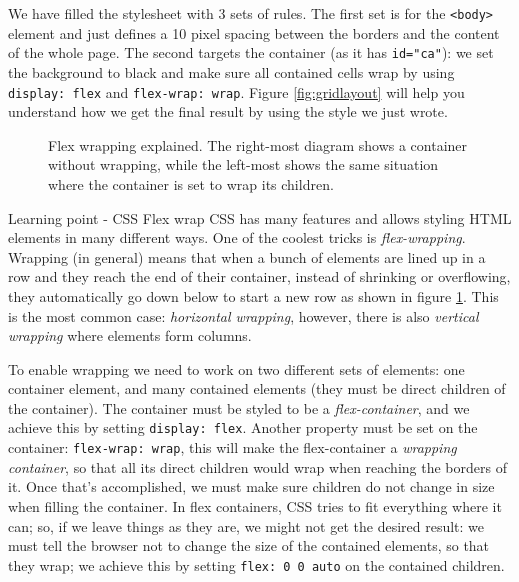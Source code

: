 We have filled the stylesheet with 3 sets of rules. The first set is for the \texttt{<body>} element
and just defines a 10 pixel spacing between the borders and the content of the whole page.
The second targets
the container (as it has \texttt{id="ca"}): we set the background to black and
make sure all contained cells wrap by using \texttt{display: flex} and \texttt{flex-wrap: wrap}.
Figure \ref{fig:gridlayout} will help you understand how we get the final result by using the
style we just wrote.

%
\begin{figure}[b]
\sidecaption

%
%
\caption{Flex wrapping explained. The right-most diagram shows a container without wrapping,
while the left-most shows the same situation where the container is set to wrap its children.}
\label{fig:flexwrap}
\end{figure}
%

\begin{tips}{Learning point - CSS Flex wrap}
CSS has many features and allows styling HTML elements in many different ways. One of the coolest tricks
is \textit{flex-wrapping}. Wrapping (in general) means that
when a bunch of elements are lined up in a row and they reach the
end of their container, instead of shrinking or overflowing, they automatically go down below to start a
new row as shown in figure \ref{fig:flexwrap}. This is the most common case: \textit{horizontal wrapping},
however, there is also \textit{vertical wrapping} where elements form columns.

To enable wrapping we need to work on two different sets of elements: one container element, and many
contained elements (they must be direct children of the container). The container must be styled to
be a \textit{flex-container}, and we achieve this by setting \texttt{display: flex}. Another property
must be set on the container: \texttt{flex-wrap: wrap}, this will make the flex-container a
\textit{wrapping container}, so that all its direct children would wrap when reaching the borders of it.
Once that's accomplished, we must make sure children do not change in size when filling the container.
In flex containers, CSS tries to fit everything where it can; so, if we leave things as they are, we might
not get the desired result: we must tell the browser not to change the size of the contained elements, so that
they wrap; we achieve this by setting \texttt{flex: 0 0 auto} on the contained children.
\end{tips}

